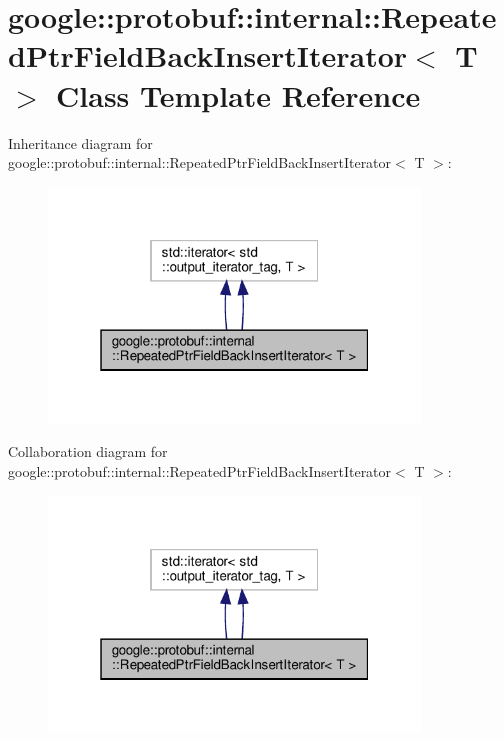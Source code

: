 \hypertarget{classgoogle_1_1protobuf_1_1internal_1_1RepeatedPtrFieldBackInsertIterator}{}\section{google\+:\+:protobuf\+:\+:internal\+:\+:Repeated\+Ptr\+Field\+Back\+Insert\+Iterator$<$ T $>$ Class Template Reference}
\label{classgoogle_1_1protobuf_1_1internal_1_1RepeatedPtrFieldBackInsertIterator}


Inheritance diagram for google\+:\+:protobuf\+:\+:internal\+:\+:Repeated\+Ptr\+Field\+Back\+Insert\+Iterator$<$ T $>$\+:
\nopagebreak
\begin{figure}[H]
\begin{center}
\leavevmode
\includegraphics[width=280pt]{classgoogle_1_1protobuf_1_1internal_1_1RepeatedPtrFieldBackInsertIterator__inherit__graph}
\end{center}
\end{figure}


Collaboration diagram for google\+:\+:protobuf\+:\+:internal\+:\+:Repeated\+Ptr\+Field\+Back\+Insert\+Iterator$<$ T $>$\+:
\nopagebreak
\begin{figure}[H]
\begin{center}
\leavevmode
\includegraphics[width=280pt]{classgoogle_1_1protobuf_1_1internal_1_1RepeatedPtrFieldBackInsertIterator__coll__graph}
\end{center}
\end{figure}
